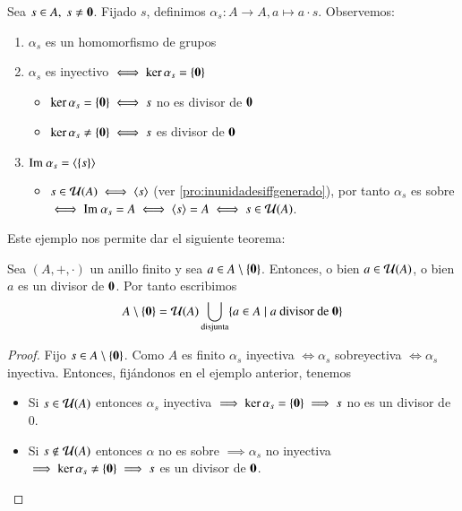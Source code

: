 \begin{ej}
	Sea $s \in A,\ s\neq \mathbf{0}$. Fijado $s$, definimos $\alpha_s : A \to A, a \mapsto a\cdot s$. Observemos:
	\begin{enumerate}
		\item $\alpha_s$ es un homomorfismo de grupos
		\item $\alpha_s$ es inyectivo $\iff \ker \alpha_s = \{ \mathbf{0} \}$
		\begin{itemize}
			\item $\ker \alpha_s = \{\mathbf{0}\} \iff s$ no es divisor de $\mathbf{0}$
			\item $\ker \alpha_s \neq \{\mathbf{0}\} \iff s$ es divisor de $\mathbf{0}$
		\end{itemize}
		\item $\text{Im } \alpha_s = \langle\{s\}\rangle$
		\begin{itemize}
			\item $s \in \mathcal{U}(A) \iff \langle s\rangle$ (ver \autoref{pro:inunidadesiffgenerado}), por tanto $\alpha_s$ es sobre $\iff \text{Im } \alpha_s = A \iff \langle s\rangle = A \iff s \in \mathcal{U}(A)$.
		\end{itemize}
		
	\end{enumerate}
\end{ej}

Este ejemplo nos permite dar el siguiente teorema:

\begin{thm}
	Sea $(A, +, \cdot)$ un anillo finito y sea $a \in A \setminus \{\mathbf{0}\}$. Entonces, o bien $a \in \mathcal{U}(A)$, o bien $a$ es un divisor de $\mathbf{0}$. Por tanto escribimos
	\begin{align*}
	A \setminus \{\mathbf{0}\} = \mathcal{U}(A) \bigcup_{\text{disjunta}} \{a \in A \mid a \text{ divisor de }\mathbf{0}\}
	\end{align*}
\end{thm}

\begin{proof}
	Fijo $s \in A \setminus \{\mathbf{0}\}$. Como $A$ es finito $\alpha_s$ inyectiva $\iff \alpha_s$ sobreyectiva $\iff \alpha_s$ inyectiva. Entonces, fijándonos en el ejemplo anterior, tenemos
	\begin{itemize}
		\item Si $s \in \mathcal{U}(A)$ entonces $\alpha_s$ inyectiva $\implies \ker \alpha_s = \{\mathbf{0}\} \implies s$ no es un divisor de $0$.
		\item Si $s \notin \mathcal{U}(A)$ entonces $\alpha$ no es sobre $\implies \alpha_s$ no inyectiva $\implies \ker \alpha_s \neq \{\mathbf{0}\} \implies s$ es un divisor de $\mathbf{0}$.
	\end{itemize}
\end{proof}

